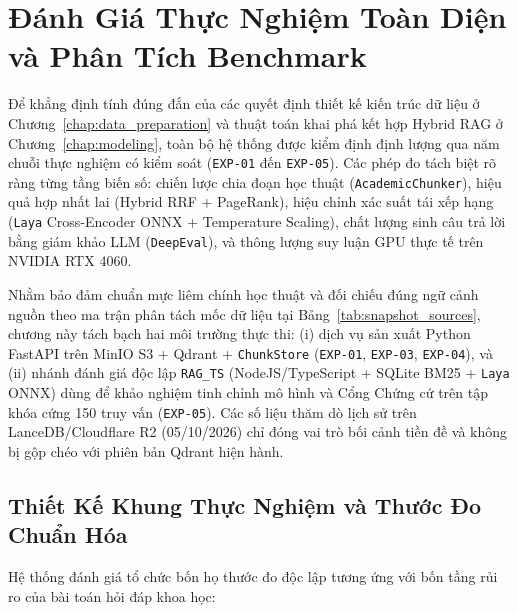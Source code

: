 
\chapter{Đánh Giá Thực Nghiệm Toàn Diện và Phân Tích Benchmark}
\label{chap:evaluation}

Để khẳng định tính đúng đắn của các quyết định thiết kế kiến trúc dữ liệu ở Chương~\ref{chap:data_preparation} và thuật toán khai phá kết hợp Hybrid RAG ở Chương~\ref{chap:modeling}, toàn bộ hệ thống được kiểm định định lượng qua năm chuỗi thực nghiệm có kiểm soát (\texttt{EXP-01} đến \texttt{EXP-05}). Các phép đo tách biệt rõ ràng từng tầng biến số: chiến lược chia đoạn học thuật (\texttt{AcademicChunker}), hiệu quả hợp nhất lai (Hybrid RRF + PageRank), hiệu chỉnh xác suất tái xếp hạng (\texttt{Laya} Cross-Encoder ONNX + Temperature Scaling), chất lượng sinh câu trả lời bằng giám khảo LLM (\texttt{DeepEval}), và thông lượng suy luận GPU thực tế trên NVIDIA RTX 4060.

Nhằm bảo đảm chuẩn mực liêm chính học thuật và đối chiếu đúng ngữ cảnh nguồn theo ma trận phân tách mốc dữ liệu tại Bảng~\ref{tab:snapshot_sources}, chương này tách bạch hai môi trường thực thi: (i) dịch vụ sản xuất Python FastAPI trên MinIO S3 + Qdrant + \texttt{ChunkStore} (\texttt{EXP-01}, \texttt{EXP-03}, \texttt{EXP-04}), và (ii) nhánh đánh giá độc lập \texttt{RAG\_TS} (NodeJS/TypeScript + SQLite BM25 + \texttt{Laya} ONNX) dùng để khảo nghiệm tinh chỉnh mô hình và Cổng Chứng cứ trên tập khóa cứng 150 truy vấn (\texttt{EXP-05}). Các số liệu thăm dò lịch sử trên LanceDB/Cloudflare R2 (05/10/2026) chỉ đóng vai trò bối cảnh tiền đề và không bị gộp chéo với phiên bản Qdrant hiện hành.

\section{Thiết Kế Khung Thực Nghiệm và Thước Đo Chuẩn Hóa}
\label{sec:ch5_framework}

Hệ thống đánh giá tổ chức bốn họ thước đo độc lập tương ứng với bốn tầng rủi ro của bài toán hỏi đáp khoa học:

